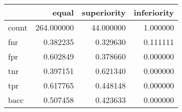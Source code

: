 \begin{tabular}{lrrr}
\toprule
{} &       equal &  superiority &  inferiority \\
\midrule
count &  264.000000 &    44.000000 &     1.000000 \\
fnr   &    0.382235 &     0.329630 &     0.111111 \\
fpr   &    0.602849 &     0.378660 &     0.000000 \\
tnr   &    0.397151 &     0.621340 &     0.000000 \\
tpr   &    0.617765 &     0.448148 &     0.000000 \\
bacc  &    0.507458 &     0.423633 &     0.000000 \\
\bottomrule
\end{tabular}
